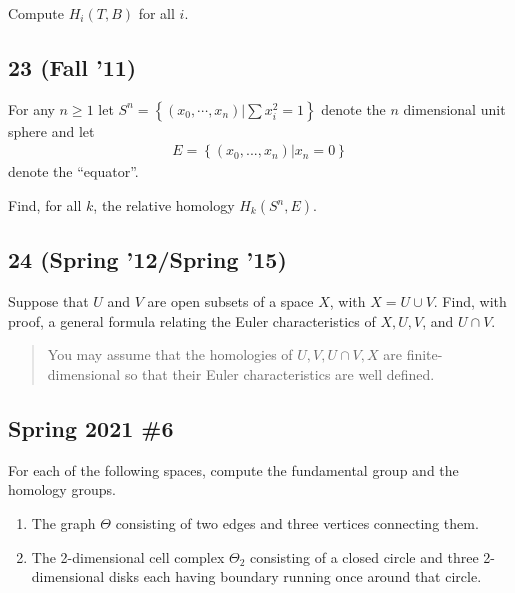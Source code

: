 Compute \(H_i (T, B)\) for all \(i\).

\hypertarget{fall-11-2}{%
\subsection{23 (Fall '11)}\label{fall-11-2}}

For any \(n \geq 1\) let
\(S^n = \left\{{(x_0 , \cdots , x_n )\mathrel{\Big|}\sum x_i^2 =1}\right\}\)
denote the \(n\) dimensional unit sphere and let
\begin{align*}E = \left\{{(x_0 , . . . , x_n )\mathrel{\Big|}x_n = 0}\right\}\end{align*}
denote the ``equator''.

Find, for all \(k\), the relative homology \(H_k (S^n , E)\).

\hypertarget{spring-12spring-15}{%
\subsection{24 (Spring '12/Spring '15)}\label{spring-12spring-15}}

Suppose that \(U\) and \(V\) are open subsets of a space \(X\), with
\(X = U \cup V\). Find, with proof, a general formula relating the Euler
characteristics of \(X, U, V\), and \(U \cap V\).

\begin{quote}
You may assume that the homologies of \(U, V, U \cap V, X\) are
finite-dimensional so that their Euler characteristics are well defined.
\end{quote}

\hypertarget{spring-2021-6}{%
\subsection{Spring 2021 \#6}\label{spring-2021-6}}

\begin{problem}[Spring 2021, 6]

For each of the following spaces, compute the fundamental group and the
homology groups.

\begin{enumerate}
\def\labelenumi{\alph{enumi}.}
\item
  The graph \(\Theta\) consisting of two edges and three vertices
  connecting them.
\item
  The 2-dimensional cell complex \(\Theta_2\) consisting of a closed
  circle and three 2-dimensional disks each having boundary running once
  around that circle.
\end{enumerate}

\end{problem}

